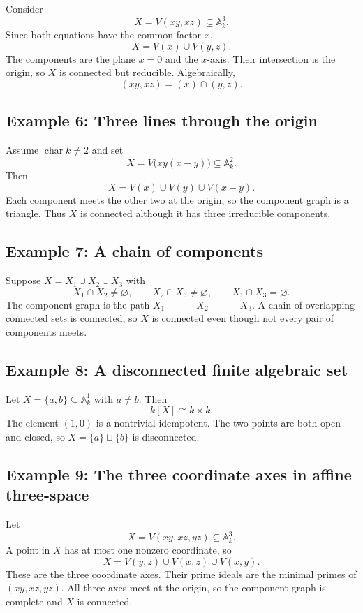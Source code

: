 Consider
\[
X=V(xy,xz)\subseteq\mathbb A_k^3.
\]
Since both equations have the common factor \(x\),
\[
X=V(x)\cup V(y,z).
\]
The components are the plane \(x=0\) and the \(x\)-axis.  Their intersection is the
origin, so \(X\) is connected but reducible.  Algebraically,
\[
(xy,xz)=(x)\cap(y,z).
\]

\subsection*{Example 6: Three lines through the origin}

Assume \(\operatorname{char}k\neq2\) and set
\[
X=V\bigl(xy(x-y)\bigr)\subseteq\mathbb A_k^2.
\]
Then
\[
X=V(x)\cup V(y)\cup V(x-y).
\]
Each component meets the other two at the origin, so the component graph is a triangle.
Thus \(X\) is connected although it has three irreducible components.

\subsection*{Example 7: A chain of components}

Suppose \(X=X_1\cup X_2\cup X_3\) with
\[
X_1\cap X_2\neq\varnothing,\qquad X_2\cap X_3\neq\varnothing,
\qquad X_1\cap X_3=\varnothing.
\]
The component graph is the path \(X_1---X_2---X_3\).  A chain of overlapping connected
sets is connected, so \(X\) is connected even though not every pair of components meets.

\subsection*{Example 8: A disconnected finite algebraic set}

Let \(X=\{a,b\}\subseteq\mathbb A_k^1\) with \(a\neq b\).  Then
\[
k[X]\cong k\times k.
\]
The element \((1,0)\) is a nontrivial idempotent.  The two points are both open and closed,
so \(X=\{a\}\sqcup\{b\}\) is disconnected.

\subsection*{Example 9: The three coordinate axes in affine three-space}

Let
\[
X=V(xy,xz,yz)\subseteq\mathbb A_k^3.
\]
A point in \(X\) has at most one nonzero coordinate, so
\[
X=V(y,z)\cup V(x,z)\cup V(x,y).
\]
These are the three coordinate axes.  Their prime ideals are the minimal primes of
\((xy,xz,yz)\).  All three axes meet at the origin, so the component graph is complete and
\(X\) is connected.

